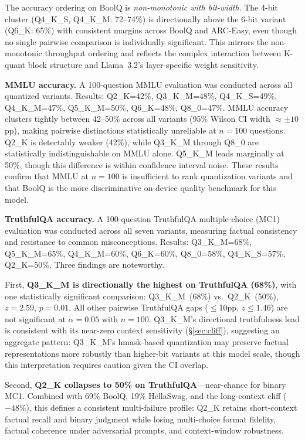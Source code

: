 \documentclass[conference]{IEEEtran}
\begin{document}
The accuracy ordering on BoolQ is \emph{non-monotonic with bit-width}.
The 4-bit cluster (Q4\_K\_S, Q4\_K\_M: 72--74\%) is directionally above the
6-bit variant (Q6\_K: 65\%) with consistent margins across BoolQ and ARC-Easy,
even though no single pairwise comparison is individually significant.
This mirrors the non-monotonic throughput ordering and reflects the complex
interaction between K-quant block structure and Llama~3.2's layer-specific
weight sensitivity.

\textbf{MMLU accuracy.}
A 100-question MMLU evaluation was conducted across all quantized variants.
Results: Q2\_K=42\%, Q3\_K\_M=48\%, Q4\_K\_S=49\%, Q4\_K\_M=47\%, Q5\_K\_M=50\%, Q6\_K=48\%, Q8\_0=47\%.
MMLU accuracy clusters tightly between 42--50\% across all variants
(95\% Wilson CI width $\approx\pm10$pp), making pairwise distinctions statistically
unreliable at $n{=}100$ questions. Q2\_K is detectably weaker (42\%), while
Q3\_K\_M through Q8\_0 are statistically indistinguishable on MMLU alone.
Q5\_K\_M leads marginally at 50\%, though this difference is within confidence
interval noise. These results confirm that MMLU at $n{=}100$ is insufficient to
rank quantization variants and that BoolQ is the more discriminative on-device
quality benchmark for this model.

\textbf{TruthfulQA accuracy.}
A 100-question TruthfulQA multiple-choice (MC1) evaluation was conducted across all
seven variants, measuring factual consistency and resistance to common misconceptions.
Results: Q3\_K\_M=68\%, Q5\_K\_M=65\%, Q4\_K\_M=60\%, Q6\_K=60\%, Q8\_0=58\%,
Q4\_K\_S=57\%, Q2\_K=50\%.
Three findings are noteworthy.

First, \textbf{Q3\_K\_M is directionally the highest on TruthfulQA (68\%)}, with
one statistically significant comparison: Q3\_K\_M~(68\%) vs.\ Q2\_K~(50\%),
$z{=}2.59$, $p{=}0.01$.
All other pairwise TruthfulQA gaps ($\leq$10pp, $z{\leq}1.46$) are not significant
at $\alpha{=}0.05$ with $n{=}100$.
Q3\_K\_M's directional truthfulness lead is consistent with its near-zero context
sensitivity (§\ref{sec:cliff}), suggesting an aggregate pattern:
Q3\_K\_M's hmask-based quantization may preserve factual representations
more robustly than higher-bit variants at this model scale, though this
interpretation requires caution given the CI overlap.

Second, \textbf{Q2\_K collapses to 50\% on TruthfulQA}---near-chance for binary MC1.
Combined with 69\% BoolQ, 19\% HellaSwag, and the long-context cliff ($-48\%$),
this defines a consistent multi-failure profile: Q2\_K retains short-context
factual recall and binary judgment while losing multi-choice format fidelity,
factual coherence under adversarial prompts, and context-window robustness.
\end{document}

